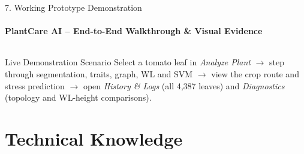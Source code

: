 \documentclass[aspectratio=169, 11pt]{beamer}
\begin{document}
\begin{frame}{7. Working Prototype Demonstration}
    \framesubtitle{PlantCare AI -- End-to-End Walkthrough \& Visual Evidence}
    \begin{columns}[T]
        \centering

        \centering
    \end{columns}
    \vspace{0.2cm}

    \begin{block}{Live Demonstration Scenario}
        \scriptsize Select a tomato leaf in \emph{Analyze Plant} $\rightarrow$ step through segmentation, traits, graph, WL and SVM $\rightarrow$ view the crop route and stress prediction $\rightarrow$ open \emph{History \& Logs} (all 4,387 leaves) and \emph{Diagnostics} (topology and WL-height comparisons).
    \end{block}
\end{frame}

\section{Technical Knowledge}
\end{document}
